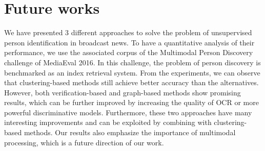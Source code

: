\section{Future works}
\label{sec:discuss}

We have presented 3 different approaches to solve the problem of unsupervised person identification in broadcast news. To have a quantitative analysis of their performance, we use the associated corpus of the Multimodal Person Discovery challenge of MediaEval 2016. In this challenge, the problem of person discovery is benchmarked as an index retrieval system.
%
From the experiments, we can observe that clustering-based methods still achieve better accuracy than the alternatives. However, both verification-based and graph-based methods show promising results, which can be further improved by increasing the quality of OCR or more powerful discriminative models. 
%
Furthermore, these two approaches have many interesting improvements and can be exploited by combining with clustering-based methods.
%
Our results also emphasize the importance of multimodal processing, which is a future direction of our work.


\endinput

